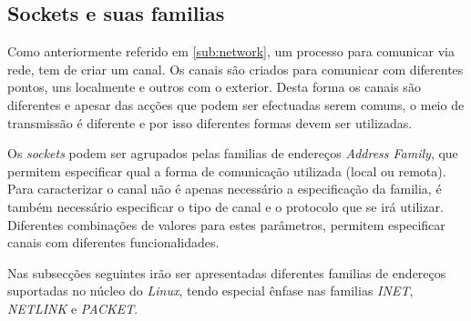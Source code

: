 


\subsection{Sockets e suas familias}
\label{sub:sockets}

Como anteriormente referido em \ref{sub:network}, um processo para comunicar via rede, tem de criar um canal.
Os canais são criados para comunicar com diferentes pontos, uns localmente e outros com o exterior.
Desta forma os canais são diferentes e apesar das acções que podem ser efectuadas serem comuns, o meio de transmissão é diferente e por isso diferentes formas devem ser utilizadas.

Os \textit{sockets} podem ser agrupados pelas familias de endereços \textit{Address Family}, que permitem especificar qual a forma de comunicação utilizada (local ou remota).
Para caracterizar o canal não é apenas necessário a especificação da familia, é também necessário especificar o tipo de canal e o protocolo que se irá utilizar.
Diferentes combinações de valores para estes parâmetros, permitem especificar canais com diferentes funcionalidades.

Nas subsecções seguintes irão ser apresentadas diferentes familias de endereços suportadas no núcleo do \textit{Linux}, tendo especial ênfase nas familias \textit{INET}, \textit{NETLINK} e \textit{PACKET}.




